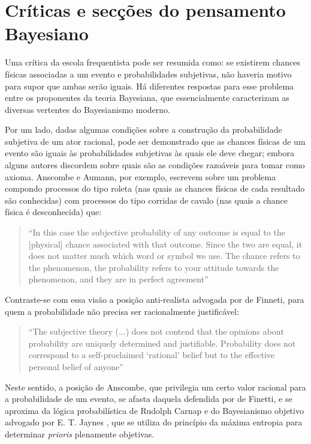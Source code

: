 \section{Críticas e secções do pensamento Bayesiano}

Uma crítica da escola frequentista pode ser resumida como: se existirem chances físicas associadas a um evento
e probabilidades subjetivas, não haveria motivo para supor que ambas serão iguais. Há diferentes respostas para esse problema 
entre os proponentes da teoria Bayesiana, que essencialmente caracterizam as diversas vertentes do Bayesianismo
moderno.

Por um lado, dadas algumas condições sobre a construção da
probabilidade subjetiva de um ator racional, pode ser demonstrado que as chances físicas de um evento são iguais 
às probabilidades subjetivas às quais ele deve chegar; embora
alguns autores discordem sobre quais são as condições razoáveis para tomar como axioma. Anscombe e Aumann, por exemplo,
escrevem sobre um problema compondo processos do tipo roleta (nas quais as chances físicas de cada resultado são conhecidas) 
com processos do tipo corridas de cavalo (nas quais a chance física é desconhecida) que:

\begin{quote}
``In this case the subjective probability of any outcome is equal to the [physical] chance associated with that outcome.
Since the two are equal, it does not matter much which word or symbol we use. The
chance refers to the phenomenon, the probability refers to your attitude
towards the phenomenon, and they are in perfect agreement''\citep{Anscombe63}
\end{quote}

Contraste-se com essa visão a posição anti-realista advogada por de Finneti, para quem a probabilidade não precisa ser racionalmente
justificável:

\begin{quote}
``The subjective theory (...) does not contend that the opinions about probability are uniquely determined and
justifiable. Probability does not correspond to a self-proclaimed `rational' belief but to the effective personal
belief of anyone''\citep{deFinetti51}
\end{quote}

Neste sentido, a posição de Anscombe, que privilegia um certo valor racional para a probabilidade de um evento,
se afasta daquela defendida por de Finetti, e se aproxima da lógica probabilística de Rudolph Carnap e do Bayesianismo
objetivo advogado por E. T. Jaynes \citep{Jaynes68}, que se utiliza do princípio da máxima entropia para determinar
{\em prioris} plenamente objetivas.

